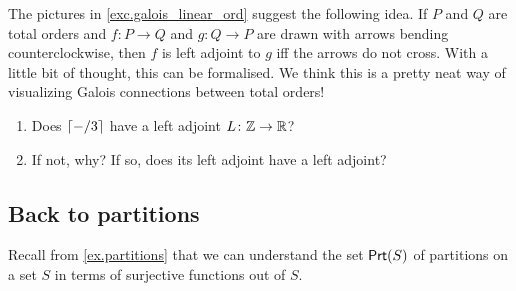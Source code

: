 \documentclass[7Sketches]{subfiles}
\begin{document}
\begin{remark}%
The pictures in \cref{exc.galois_linear_ord} suggest the following idea. If $P$
and $Q$ are total orders and $f\colon P\to Q$ and $g\colon Q\to P$ are drawn
with arrows bending counterclockwise, then $f$ is left adjoint to $g$ iff the
arrows do not cross. With a little bit of thought, this can be formalised. We
think this is a pretty neat way of visualizing Galois connections between total
orders!
\end{remark}

%
%
%
%
%

\begin{exercise}%
\label{exc.extra_right_adj_ceil}
\begin{enumerate}
	\item Does $\lceil-/3\rceil$ have a left adjoint $L\colon \mathbb{Z}\to\mathbb{R}$?
	\item If not, why? If so, does its left adjoint have a left adjoint?
	\qedhere
\end{enumerate}
\end{exercise}

\subsection{Back to partitions}%
\label{subsec.back_to_parts}%
Recall from \cref{ex.partitions} that we can understand the set $\mathsf{Prt}(S)$ of partitions on a set $S$
in terms of surjective functions out of $S$.
\end{document}
